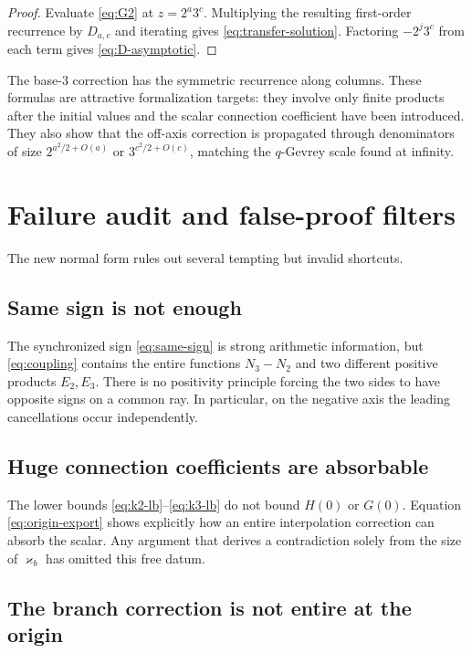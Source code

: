 \documentclass[11pt]{article}
\theoremstyle{definition}
\newcommand{\kk}{\varkappa}
\begin{document}
\begin{proof}
Evaluate \eqref{eq:G2} at $z=2^a3^c$.  Multiplying the resulting first-order recurrence by $D_{a,c}$ and iterating gives \eqref{eq:transfer-solution}.  Factoring $-2^j3^c$ from each term gives \eqref{eq:D-asymptotic}.
\end{proof}

The base-$3$ correction has the symmetric recurrence along columns.  These formulas are attractive formalization targets: they involve only finite products after the initial values and the scalar connection coefficient have been introduced.  They also show that the off-axis correction is propagated through denominators of size $2^{a^2/2+O(a)}$ or $3^{c^2/2+O(c)}$, matching the $q$-Gevrey scale found at infinity.

\section{Failure audit and false-proof filters}

The new normal form rules out several tempting but invalid shortcuts.

\subsection{Same sign is not enough}

The synchronized sign \eqref{eq:same-sign} is strong arithmetic information, but \eqref{eq:coupling} contains the entire functions $N_3-N_2$ and two different positive products $E_2,E_3$.  There is no positivity principle forcing the two sides to have opposite signs on a common ray.  In particular, on the negative axis the leading cancellations occur independently.

\subsection{Huge connection coefficients are absorbable}

The lower bounds \eqref{eq:k2-lb}--\eqref{eq:k3-lb} do not bound $H(0)$ or $G(0)$.  Equation \eqref{eq:origin-export} shows explicitly how an entire interpolation correction can absorb the scalar.  Any argument that derives a contradiction solely from the size of $\kk_b$ has omitted this free datum.

\subsection{The branch correction is not entire at the origin}
\end{document}
